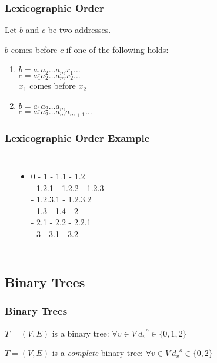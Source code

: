 \documentclass[dvipsnames]{beamer}
\begin{document}
\begin{frame}
  \frametitle{Lexicographic Order}

  \begin{definition}
    Let $b$ and $c$ be two addresses.

    $b$ comes before $c$ if one of the following holds:
    \begin{enumerate}
      \item $b=a_1 a_2 \ldots a_m x_1 \ldots$\\
        $c=a_1 a_2 \ldots a_m x_2 \ldots$\\
        $x_1$ comes before $x_2$
      \pause
      \item $b=a_1 a_2 \ldots a_m$\\
        $c=a_1 a_2 \ldots a_m a_{m+1} \ldots$
    \end{enumerate}
  \end{definition}
\end{frame}

\begin{frame}
  \frametitle{Lexicographic Order Example}

  \begin{example}
    \begin{columns}
      \begin{center}
      \end{center}

      \begin{itemize}
        \item 0 - 1 - 1.1 - 1.2\\
          - 1.2.1 - 1.2.2 - 1.2.3\\
          - 1.2.3.1 - 1.2.3.2\\
          - 1.3 - 1.4 - 2\\
          - 2.1 - 2.2 - 2.2.1\\
          - 3 - 3.1 - 3.2
      \end{itemize}
    \end{columns}
  \end{example}
\end{frame}

\subsection{Binary Trees}

\begin{frame}
  \frametitle{Binary Trees}

  \begin{definition}
    $T=(V,E)$ is a \alert{binary tree}: $\forall v \in V~{d_v}^o \in \{0,1,2\}$

    \bigskip
    $T=(V,E)$ is a \emph{complete} binary tree:
      $\forall v \in V~{d_v}^o \in \{0,2\}$
  \end{definition}
\end{frame}
\end{document}
